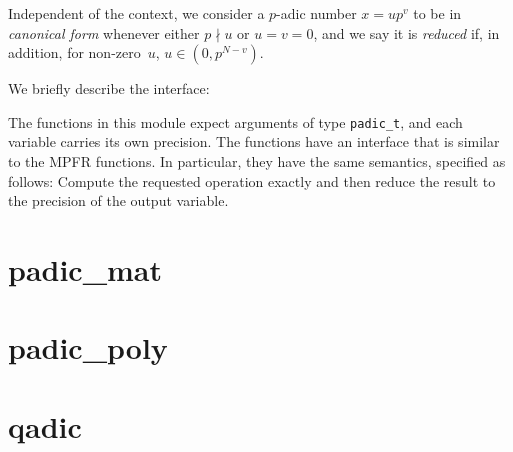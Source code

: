 \documentclass[a4paper,10pt]{book}
\newcommand{\code}{\lstinline}
\begin{document}
{{Independent of the context, we consider a $p$-adic number
$x = u p^v$ to be in \emph{canonical form} whenever either
$p \nmid u$ or $u = v = 0$, and we say it is \emph{reduced}
if, in addition, for non-zero~$u$, $u \in (0, p^{N-v})$.

We briefly describe the interface:

The functions in this module expect arguments of type \code{padic_t},
and each variable carries its own precision.  The functions have an
interface that is similar to the MPFR functions.  In particular, they
have the same semantics, specified as follows:  Compute the requested
operation exactly and then reduce the result to the precision of the
output variable.




\chapter{padic\_mat}



\chapter{padic\_poly}



\chapter{qadic}



}}
\end{document}
